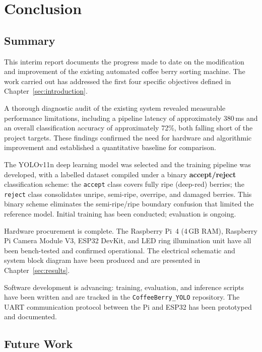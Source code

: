 \section{Conclusion}\label{sec:conclusion}

\subsection{Summary}

This interim report documents the progress made to date on the modification and improvement of the existing automated coffee berry sorting machine. The work carried out has addressed the first four specific objectives defined in Chapter~\ref{sec:introduction}.

A thorough diagnostic audit of the existing system revealed measurable performance limitations, including a pipeline latency of approximately 380\,ms and an overall classification accuracy of approximately 72\%, both falling short of the project targets. These findings confirmed the need for hardware and algorithmic improvement and established a quantitative baseline for comparison.

The YOLOv11n deep learning model was selected and the training pipeline was developed, with a labelled dataset compiled under a binary \textbf{accept/reject} classification scheme: the \texttt{accept} class covers fully ripe (deep-red) berries; the \texttt{reject} class consolidates unripe, semi-ripe, overripe, and damaged berries. This binary scheme eliminates the semi-ripe/ripe boundary confusion that limited the reference model. Initial training has been conducted; evaluation is ongoing. %

Hardware procurement is complete. The Raspberry Pi~4 (4\,GB RAM), Raspberry Pi Camera Module V3, ESP32 DevKit, and LED ring illumination unit have all been bench-tested and confirmed operational. The electrical schematic and system block diagram have been produced and are presented in Chapter~\ref{sec:results}.

Software development is advancing: training, evaluation, and inference scripts have been written and are tracked in the \texttt{CoffeeBerry\_YOLO} repository. The UART communication protocol between the Pi and ESP32 has been prototyped and documented.

\subsection{Future Work}

